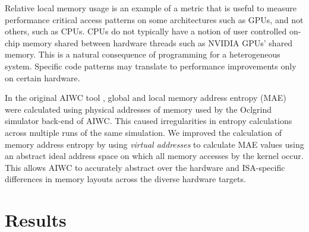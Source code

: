 \documentclass[review=false, sigchi]{acmart}
\begin{document}
	Relative local memory usage is an example of a metric that is useful to measure performance critical access patterns on some architectures such as GPUs, and not others, such as CPUs. CPUs do not typically have a notion of user controlled on-chip memory shared between hardware threads such as NVIDIA GPUs' shared memory. This is a natural consequence of programming for a heterogeneous system. Specific code patterns may translate to performance improvements only on certain hardware.
	
	In the original AIWC tool \cite{beau_johnston_2017_1134175}, global and local memory address entropy (MAE) were calculated using physical addresses of memory used by the Oclgrind simulator back-end of AIWC. This caused irregularities in entropy calculations across multiple runs of the same simulation. We improved the calculation of memory address entropy by using \textit{virtual addresses} to calculate MAE values using an abstract ideal address space on which all memory accesses by the kernel occur. This allows AIWC to accurately abstract over the hardware and ISA-specific differences in memory layouts across the diverse hardware targets.
		
	\section{Results} \label{results}
	
\end{document}
